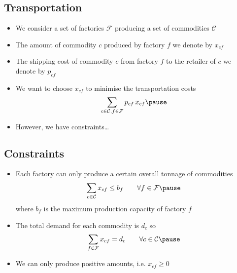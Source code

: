 
\begin{slide}
\section{Transportation}

\begin{PauseHighLight}
  \begin{itemize}
  \item We consider a set of factories $\mathcal{F}$ producing a set of
    commodities $\mathcal{C}$\pause
  \item The amount of commodity $c$ produced by factory $f$ we denote by
    $x_{cf}$\pause
  \item The shipping cost of commodity $c$ from factory $f$ to the
    retailer of $c$ we denote by $p_{cf}$\pause
  \item We want to choose $x_{cf}$ to minimise the transportation costs
    \begin{align*}
      \sum_{c\in\mathcal{C}, f\in\mathcal{F}} p_{cf}\, x_{cf}\pause
    \end{align*}
  \item However, we have constraints\ldots\pause
  \end{itemize}
\end{PauseHighLight}

\end{slide}


\begin{slide}
\section{Constraints}

\begin{PauseHighLight}
  \begin{itemize}
  \item Each factory can only produce a certain overall tonnage of
    commodities
    \begin{align*}
      \sum_{c\in\mathcal{C}} x_{cf} \leq b_f \quad \quad \forall f \in \mathcal{F}\pause
    \end{align*}
    where $b_f$ is the maximum production capacity of factory $f$\pause
  \item The total demand for each commodity is $d_c$ so
    \begin{align*}
      \sum_{f\in\mathcal{F}} x_{cf} = d_c \quad \quad \forall c \in \mathcal{C}\pause
    \end{align*}
  \item We can only produce positive amounts, i.e. $x_{cf}\geq0$\pause
  \end{itemize}
\end{PauseHighLight}

\end{slide}

